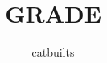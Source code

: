 \documentclass[11pt]{article}
\begin{document}
\title{GRADE}
\author{catbuilts}
\date{\vspace{-5ex}}
\maketitle

\noindent
{}
\begin{center}



\end{center}
\end{document}
